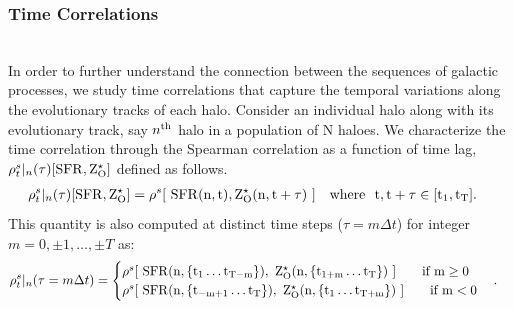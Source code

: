\subsubsection{Time Correlations}
\label{sec:time-correl-sfrZ}
 \\
In order to further understand the connection between the sequences of galactic processes, we study time correlations that capture the temporal variations along the evolutionary tracks of each halo.
Consider an individual halo along with its evolutionary track, say $n^{\rm{th}}$ halo in a population of N haloes. We characterize the time correlation through the Spearman correlation as a function of time lag, $\rho^s_t |_{n}(\tau)[\rm{SFR}, Z^{\star}_{\rm{O}}]$ defined as follows.
\begin{align}
\rho^s_t |_{n}(\tau)[\rm{SFR}, Z^{\star}_{\rm{O}}] &= \rho^s [ ~\rm{SFR}(n,t), Z^{\star}_{\rm{O}}(n,t+\tau) ~] \quad \text{where } ~t, t+\tau \in [t_1,t_T].
\end{align}
This quantity is also computed at distinct time steps ($\tau = m \Delta t$) for integer $m=0, \pm1, \ldots, \pm T$ as:
\begin{align}
\label{eq:def-time-correl-nth-halo}
\rho^s_t |_{n}(\tau = m \Delta t) &= 
\begin{cases}
\rho^s [ ~\rm{SFR}(n,\{t_1 \ldots t_{T-m}\}), ~Z^{\star}_{\rm{O}}(n,\{t_{1+m} \ldots t_T\}) ~]  \qquad \text{if } m \geq 0 \\
\rho^s [ ~\rm{SFR}(n,\{t_{-m+1} \ldots t_T\}), ~Z^{\star}_{\rm{O}}(n,\{t_1 \ldots t_{T+m}\}) ~] \qquad \text{if } m < 0
\end{cases}.
\end{align}


